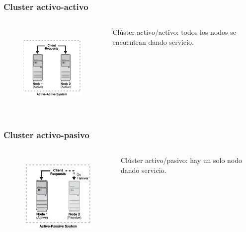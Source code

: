 \documentclass{beamer}
\begin{document}

\begin{frame}
\frametitle{Cluster activo-activo}

\begin{columns}

\column[t]{4cm}

\begin{figure}[h]

\begin{center}
  \centering
  \includegraphics[height=1.7in]{figs/active-cluster.png}
\end{center}
\end{figure}


\column[t]{5cm}
\vspace{2cm}

\alert{Clúster activo/activo}: todos los nodos se encuentran dando servicio.

\end{columns}


\end{frame}



\begin{frame}
\frametitle{Cluster activo-pasivo}

\begin{columns}

\column[t]{4cm}

\begin{figure}[h]

\begin{center}
  \centering
  \includegraphics[height=1.7in]{figs/passive-cluster.png}
\end{center}
\end{figure}


\column[t]{5cm}
\vspace{2cm}

\alert{Clúster activo/pasivo}: hay un solo nodo dando servicio.

\end{columns}


\end{frame}
\end{document}
